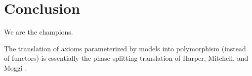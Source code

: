 \section{Conclusion}
\label{sec:conclusion}

We are the champions.

  The translation of axioms
parameterized by models into polymorphism (instead of functors) is
essentially the phase-splitting translation of Harper, Mitchell, and
Moggi \cite{harper+:popl90}.



